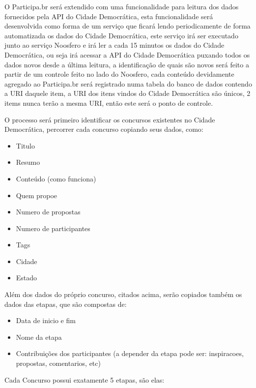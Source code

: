 \documentclass[12pt]{article}
\begin{document}
O Participa.br será extendido com uma funcionalidade para leitura dos dados
fornecidos pela API do Cidade Democrática, esta funcionalidade será
desenvolvida como forma de um serviço que ficará lendo periodicamente de forma
automatizada os dados do Cidade Democrática, este serviço irá ser executado
junto ao serviço Noosfero e irá ler a cada 15 minutos os dados do Cidade
Democrática, ou seja irá acessar a API do Cidade Democrática puxando todos os
dados novos desde a última leitura, a identificação de quais são novos será
feito a partir de um controle feito no lado do Noosfero, cada conteúdo
devidamente agregado ao Participa.br será registrado numa tabela do banco de
dados contendo a URI daquele item, a URI dos itens vindos do Cidade
Democrática são únicos, 2 items nunca terão a mesma URI, então este será o
ponto de controle.

O processo será primeiro identificar os concursos existentes no Cidade
Democrática, percorrer cada concurso copiando seus dados, como:

\begin{itemize}
  \item Titulo
  \item Resumo
  \item Conteúdo (como funciona)
  \item Quem propoe
  \item Numero de propostas
  \item Numero de participantes
  \item Tags
  \item Cidade
  \item Estado
\end{itemize}

Além dos dados do próprio concurso, citados acima, serão copiados também os
dados das etapas, que são compostas de:

\begin{itemize}
  \item Data de inicio e fim
  \item Nome da etapa
  \item Contribuições dos participantes (a depender da etapa pode ser: inspiracoes, propostas, comentarios, etc)
\end{itemize}

Cada Concurso possui exatamente 5 etapas, são elas:
\end{document}
